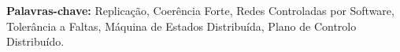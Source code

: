 \vfill

\begin{flushleft}
\textbf{Palavras-chave:}
Replicação, Coerência Forte, Redes Controladas por Software, Tolerância a
Faltas, Máquina de Estados Distribuída, Plano de Controlo Distribuído. 
\end{flushleft}

\LIMPA
